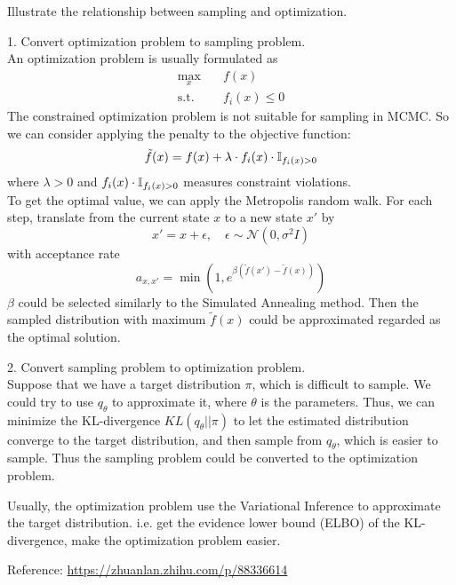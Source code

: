 \begin{homeworkProblem}

Illustrate the relationship between sampling and optimization.

\solution

1. Convert optimization problem to sampling problem. \\
An optimization problem is usually formulated as
\begin{align*}
\max_{x}  &\quad f(x) \\
\text{s.t.} &\quad f_i(x) \leq 0
\end{align*}
The constrained optimization problem is not suitable for sampling in MCMC. So we can consider applying the penalty to the objective function:
$$\tilde{f}(x) = f(x) + \lambda \cdot f_i(x)\cdot\mathbb{I}_{f_i(x) > 0}$$
where $\lambda > 0$ and $f_i(x)\cdot\mathbb{I}_{f_i(x) > 0}$ measures constraint violations. \\
To get the optimal value, we can apply the Metropolis random walk. For each step, translate from the current state $x$ to a new state $x'$ by
$$x' = x + \epsilon, \quad \epsilon \sim \mathcal{N}(0, \sigma^2 I)$$
with acceptance rate
$$a_{x,x'} = \min\left(1, e^{\beta\left(\tilde{f}(x')-\tilde{f}(x)\right)} \right)$$
$\beta$ could be selected similarly to the Simulated Annealing method. Then the sampled distribution with maximum $\tilde{f}(x)$ could be approximated regarded as the optimal solution.

2. Convert sampling problem to optimization problem. \\
Suppose that we have a target distribution $\pi$, which is difficult to sample. We could try to use $q_{\theta}$ to approximate it, where $\theta$ is the parameters. Thus, we can minimize the KL-divergence $KL(q_{\theta}||\pi)$ to let the estimated distribution converge to the target distribution, and then sample from $q_{\theta}$, which is easier to sample. Thus the sampling problem could be converted to the optimization problem.

Usually, the optimization problem use the Variational Inference to approximate the target distribution. i.e. get the evidence lower bound (ELBO) of the KL-divergence, make the optimization problem easier.

Reference: \href{https://zhuanlan.zhihu.com/p/88336614}{https://zhuanlan.zhihu.com/p/88336614}

\end{homeworkProblem}

\newpage